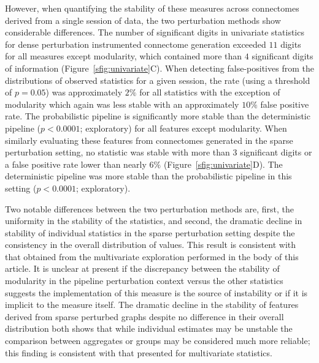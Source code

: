 \documentclass[fleqn,10pt]{SelfArx} %
\newcommand{\new}[1]{{#1}}
\begin{document}
However, when quantifying the stability of these measures across connectomes derived from a single session of data, the
two perturbation methods show considerable differences. The number of significant digits in univariate statistics for
\new{dense} perturbation instrumented connectome generation exceeded $11$ digits for all measures except modularity, which
contained more than $4$ significant digits of information (Figure~\ref{sfig:univariate}C). When detecting \new{false-positives}
from the distributions of observed statistics for a given session, the rate (using a threshold of $p = 0.05$)
was approximately $2\%$ for all statistics with the exception of modularity which again was less stable with an
approximately $10\%$ false positive rate. The probabilistic pipeline is significantly more stable than the
deterministic pipeline ($p < 0.0001$; exploratory) for all features except modularity. When similarly evaluating these
features from connectomes generated in the \new{sparse} perturbation setting, no statistic was stable with more than $3$
significant digits or a false positive rate lower than nearly $6\%$ (Figure~\ref{sfig:univariate}D). The deterministic
pipeline was more stable than the probabilistic pipeline in this setting ($p < 0.0001$; exploratory).

Two notable differences between the two perturbation methods are, first, the uniformity in the stability of the
statistics, and second, the dramatic decline in stability of individual statistics in the \new{sparse} perturbation setting
despite the consistency in the overall distribution of values. \new{This result is consistent with that obtained
from the multivariate exploration performed in the body of this article.} It is unclear at present if the discrepancy
between the stability of modularity in the pipeline perturbation context versus the other statistics suggests the
implementation of this measure is the source of instability or if it is implicit to the measure itself. The dramatic
decline in the stability of features derived from \new{sparse} perturbed graphs despite no difference in their overall
distribution both shows that while individual estimates may be unstable the comparison between aggregates or groups may
be considered much more reliable; this finding is consistent with that presented for multivariate statistics.
\end{document}
